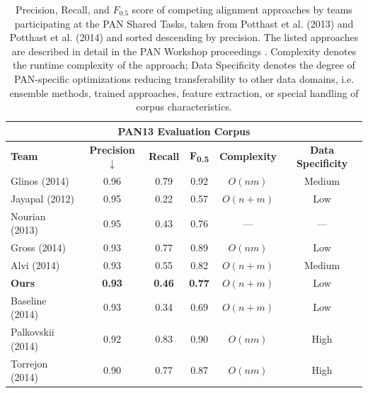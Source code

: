 \documentclass[fleqn,10pt]{wlscirep}
\begin{document}
\begin{table}[ht]
\setlength{\tabcolsep}{4pt}%
\caption{Precision, Recall, and $F_{0.5}$ score of competing alignment approaches by teams participating at the PAN Shared Tasks, taken from Potthast et al. (2013)\cite{potthast:2013} and Potthast et al. (2014)\cite{potthast:2014} and sorted descending by precision. The listed approaches are described in detail in the PAN Workshop proceedings \cite{pan:2012,pan:2013,pan:2014}. Complexity denotes the runtime complexity of the approach; Data Specificity denotes the degree of PAN-specific optimizations reducing transferability to other data domains, i.e. ensemble methods, trained approaches, feature extraction, or special handling of corpus characteristics.}
\label{tab:pan13}
\centering
\begin{tabular}{@{}l*{3}{c}cc@{}}
\multicolumn{6}{c}{\textsf{\textbf{PAN13 Evaluation Corpus}}} \\[1.1ex]
\toprule
\textsf{\textbf{Team}}  & \textsf{\textbf{Precision$\downarrow$}} & \textsf{\textbf{Recall }}       & \textsf{\textbf{F\textsubscript{0.5}}}         & \textsf{\textbf{Complexity}}    & \textsf{\textbf{Data Specificity}}  \\
\midrule
        Glinos (2014)   &       0.96            &    0.79       &  0.92             & $O(nm)$       & Medium            \\
       Jayapal (2012)   &       0.95            &    0.22       &  0.57             & $O(n+m)$      & Low               \\
       Nourian (2013)   &       0.95            &    0.43       &  0.76             & ---           & ---               \\
         Gross (2014)   &       0.93            &    0.77       &  0.89             & $O(nm)$       & Low               \\
         Alvi (2014)    &       0.93            &    0.55       &  0.82             & $O(n+m)$      & Medium            \\
        \textbf{Ours}   &\textbf{0.93}          &\textbf{0.46}  &  \textbf{0.77}    & $O(n+m)$      & Low               \\
      Baseline (2014)   &       0.93            &    0.34       &  0.69             & $O(n+m)$      & Low               \\
    Palkovskii (2014)   &       0.92            &    0.83       &  0.90             & $O(nm)$       & High              \\
      Torrejon (2014)   &       0.90            &    0.77       &  0.87             & $O(nm)$       & High              \\

\end{tabular}
\end{table}
\end{document}
